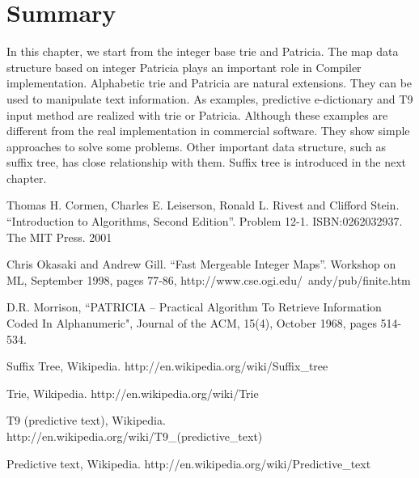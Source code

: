 \documentclass[UTF8]{article}
\begin{document}
\section{Summary}

In this chapter, we start from the integer base trie and Patricia. The
map data structure based on integer Patricia plays an important role
in Compiler implementation. Alphabetic trie and Patricia are
natural extensions. They can be used to manipulate text information.
As examples, predictive e-dictionary and T9 input method are
realized with trie or Patricia. Although these examples
are different from the real implementation in commercial software.
They show simple approaches to solve some problems.
Other important data structure, such as suffix tree, has close
relationship with them. Suffix tree is introduced in the next chapter.

\begin{thebibliography}{99}

Thomas H. Cormen, Charles E. Leiserson, Ronald L. Rivest and Clifford Stein.
``Introduction to Algorithms, Second Edition''. Problem 12-1. ISBN:0262032937. The MIT Press. 2001

Chris Okasaki and Andrew Gill. ``Fast Mergeable Integer
Maps''. Workshop on ML, September 1998, pages 77-86, http://www.cse.ogi.edu/~andy/pub/finite.htm

D.R. Morrison, ``PATRICIA -- Practical Algorithm To Retrieve  Information Coded In Alphanumeric", Journal of the ACM, 15(4), October 1968, pages 514-534.

Suffix Tree, Wikipedia. http://en.wikipedia.org/wiki/Suffix\_tree

Trie, Wikipedia. http://en.wikipedia.org/wiki/Trie

T9 (predictive text), Wikipedia. http://en.wikipedia.org/wiki/T9\_(predictive\_text)

Predictive text,
Wikipedia. http://en.wikipedia.org/wiki/Predictive\_text

\end{thebibliography}

\ifx\wholebook\relax\else
\end{document}
